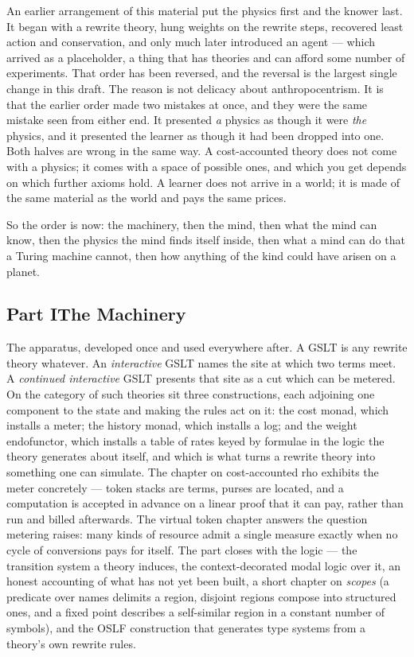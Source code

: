 \documentclass[12pt,openright,twoside]{book}
\theoremstyle{remark}
\theoremstyle{plain}
\theoremstyle{remark}
\theoremstyle{plain}
\theoremstyle{plain}
\begin{document}
An earlier arrangement of this material put the physics first and the
knower last.
It began with a rewrite theory, hung weights on the rewrite steps,
recovered least action and conservation, and only much later introduced
an agent --- which arrived as a placeholder, a thing that has theories
and can afford some number of experiments.
That order has been reversed, and the reversal is the largest single
change in this draft.
The reason is not delicacy about anthropocentrism.
It is that the earlier order made two mistakes at once, and they were the
same mistake seen from either end.
It presented \emph{a} physics as though it were \emph{the} physics, and
it presented the learner as though it had been dropped into one.
Both halves are wrong in the same way.
A cost-accounted theory does not come with a physics; it comes with a
space of possible ones, and which you get depends on which further axioms
hold.
A learner does not arrive in a world; it is made of the same material as
the world and pays the same prices.

So the order is now: the machinery, then the mind, then what the mind can
know, then the physics the mind finds itself inside, then what a mind can
do that a Turing machine cannot, then how anything of the kind could have
arisen on a planet.

\bigskip

\subsection*{Part I\quad The Machinery}

The apparatus, developed once and used everywhere after.
A GSLT is any rewrite theory whatever.
An \emph{interactive} GSLT names the site at which two terms meet.
A \emph{continued interactive} GSLT presents that site as a cut which can
be metered.
On the category of such theories sit three constructions, each adjoining
one component to the state and making the rules act on it: the cost
monad, which installs a meter; the history monad, which installs a log;
and the weight endofunctor, which installs a table of rates keyed by
formulae in the logic the theory generates about itself, and which is
what turns a rewrite theory into something one can simulate.
The chapter on cost-accounted rho exhibits the meter concretely --- token
stacks are terms, purses are located, and a computation is accepted in
advance on a linear proof that it can pay, rather than run and billed
afterwards.
The virtual token chapter answers the question metering raises: many
kinds of resource admit a single measure exactly when no cycle of
conversions pays for itself.
The part closes with the logic --- the transition system a theory
induces, the context-decorated modal logic over it, an honest accounting
of what has not yet been built, a short chapter on \emph{scopes} (a
predicate over names delimits a region, disjoint regions compose into
structured ones, and a fixed point describes a self-similar region in a
constant number of symbols), and the OSLF construction that generates
type systems from a theory's own rewrite rules.
\end{document}
